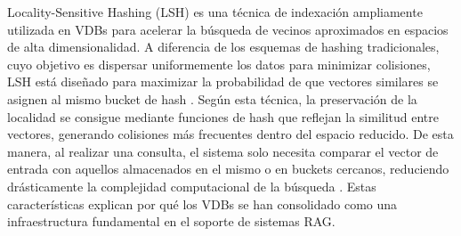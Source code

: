 Locality-Sensitive Hashing (LSH) es una técnica de indexación ampliamente utilizada en VDBs para acelerar la búsqueda de vecinos aproximados en espacios de alta 
dimensionalidad. A diferencia de los esquemas de hashing tradicionales, cuyo objetivo es dispersar uniformemente los datos para minimizar colisiones, LSH está diseñado 
para maximizar la probabilidad de que vectores similares se asignen al mismo bucket de hash \parencite{ma2025vector}. Según esta técnica, la preservación de la localidad 
se consigue mediante funciones de hash que reflejan la similitud entre vectores, generando colisiones más frecuentes dentro del espacio reducido. De esta manera, al realizar una 
consulta, el sistema solo necesita comparar el vector de entrada con aquellos almacenados en el mismo o en buckets cercanos, reduciendo drásticamente la complejidad 
computacional de la búsqueda \parencite{ma2025vector}. Estas características explican por qué los VDBs se han consolidado como una infraestructura fundamental en el soporte
de sistemas RAG.

